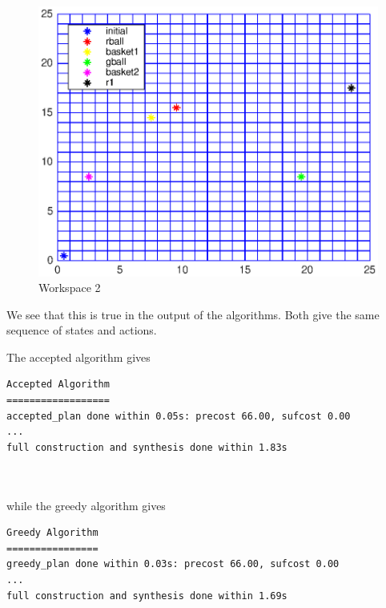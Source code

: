\begin{figure}
\centering
\includegraphics{workspace2.eps}
\caption{Workspace 2}
\label{workspace2}
\end{figure}

We see that this is true in the output of the algorithms. Both give the same sequence of states and actions.

The accepted algorithm gives \\


\begin{minipage}{\textwidth}
\begingroup
\fontsize{9pt}{12pt}\selectfont
\begin{lstlisting}
Accepted Algorithm
==================
accepted_plan done within 0.05s: precost 66.00, sufcost 0.00
...
full construction and synthesis done within 1.83s 
\end{lstlisting}
\endgroup
\end{minipage} \\ \\


while the greedy algorithm gives \\


\begin{minipage}{\textwidth}
\begingroup
\fontsize{9pt}{12pt}\selectfont
\begin{lstlisting}
Greedy Algorithm
================
greedy_plan done within 0.03s: precost 66.00, sufcost 0.00
...
full construction and synthesis done within 1.69s
\end{lstlisting}
\endgroup
\end{minipage} \\ \\


